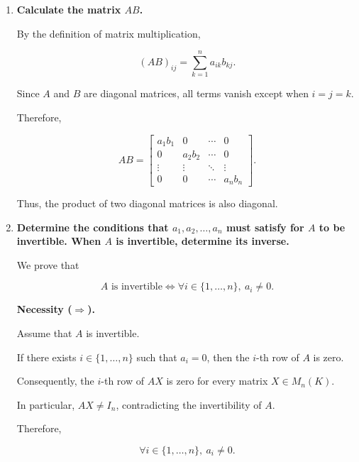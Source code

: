 \begin{enumerate}[label=\alph*)]

    \item \textbf{Calculate the matrix $AB$.}

    \begin{answer}
        By the definition of matrix multiplication,

        $$
        (AB)_{ij}=\sum_{k=1}^{n}a_{ik}b_{kj}.
        $$

        Since $A$ and $B$ are diagonal matrices,
        all terms vanish except when $i=j=k$.

        Therefore,

        $$
        \boxed{
        AB=
        \begin{bmatrix}
            a_1b_1 & 0 & \cdots & 0 \\
            0 & a_2b_2 & \cdots & 0 \\
            \vdots & \vdots & \ddots & \vdots \\
            0 & 0 & \cdots & a_nb_n
        \end{bmatrix}
        }.
        $$

        Thus, the product of two diagonal
        matrices is also diagonal.
    \end{answer}

    \item \textbf{Determine the conditions that
    $a_1,a_2,\ldots,a_n$ must satisfy for $A$
    to be invertible. When $A$ is invertible,
    determine its inverse.}

    \begin{answer}
        We prove that

        $$
        A\text{ is invertible}
        \iff
        \forall i\in\{1,\ldots,n\},\ a_i\neq0.
        $$

        \medskip
        \noindent\textbf{Necessity ($\Rightarrow$).}

        Assume that $A$ is invertible.

        If there exists $i\in\{1,\ldots,n\}$
        such that $a_i=0$, then the $i$-th
        row of $A$ is zero.

        Consequently, the $i$-th row of
        $AX$ is zero for every matrix
        $X\in M_n(K)$.

        In particular, $AX\neq I_n$,
        contradicting the invertibility of $A$.

        Therefore,

        $$
        \forall i\in\{1,\ldots,n\},\ a_i\neq0.
        $$


\end{answer}
\end{enumerate}

